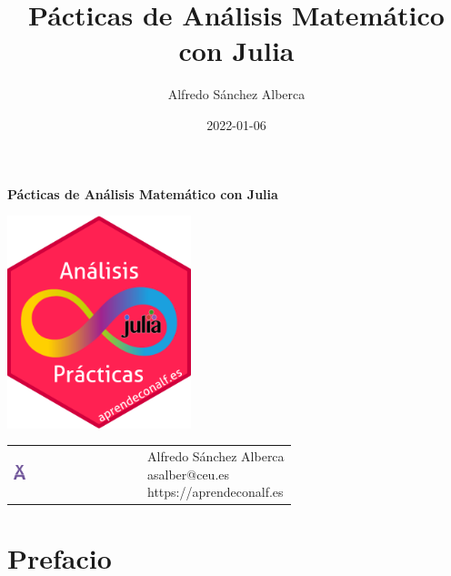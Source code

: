 \documentclass[
  a4paper,
]{scrreport}
\title{Pácticas de Análisis Matemático con Julia}
\author{Alfredo Sánchez Alberca}
\date{2022-01-06}
\renewcommand*\contentsname{Tabla de contenidos}
\newcommand\contentsname{Tabla de contenidos}
\theoremstyle{definition}
\theoremstyle{remark}
\begin{document}
\begin{titlepage}

\begin{center}
\vspace*{5cm}

\Huge
{\textbf{\textsf{Pácticas de Análisis Matemático con Julia}}}

\vspace{0.5cm}
\LARGE
{\textbf{\textsf{}}}

\vspace{1.5cm}

\includegraphics[width=0.4\textwidth]{img/logos/sticker.png}
\end{center}

\vfill

\begin{flushleft}
\begin{tabular}{ll}
\includegraphics[width=0.1\textwidth]{img/logos/aprendeconalf.png} & \parbox[b]{5cm}{\Large\textsf{Alfredo
Sánchez
Alberca}\\ \textsf{asalber@ceu.es} \\ \textsf{https://aprendeconalf.es}}
\end{tabular}
\end{flushleft}
\end{titlepage}
\renewcommand*\contentsname{Tabla de contenidos}
{
\hypersetup{linkcolor=}
\setcounter{tocdepth}{2}
\tableofcontents
}


\chapter*{Prefacio}\label{prefacio}
\end{document}
